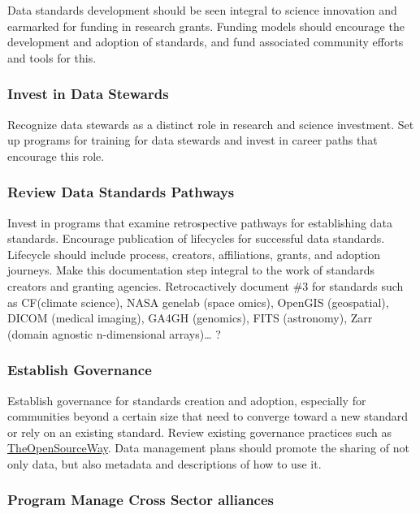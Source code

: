 \documentclass[
  letterpaper,
  DIV=11,
  numbers=noendperiod]{scrartcl}
\begin{document}
Data standards development should be seen integral to science innovation
and earmarked for funding in research grants. Funding models should
encourage the development and adoption of standards, and fund associated
community efforts and tools for this.

\subsubsection{Invest in Data Stewards}\label{invest-in-data-stewards}

Recognize data stewards as a distinct role in research and science
investment. Set up programs for training for data stewards and invest in
career paths that encourage this role.

\subsubsection{Review Data Standards
Pathways}\label{review-data-standards-pathways}

Invest in programs that examine retrospective pathways for establishing
data standards. Encourage publication of lifecycles for successful data
standards. Lifecycle should include process, creators, affiliations,
grants, and adoption journeys. Make this documentation step integral to
the work of standards creators and granting agencies. Retrocactively
document \#3 for standards such as CF(climate science), NASA genelab
(space omics), OpenGIS (geospatial), DICOM (medical imaging), GA4GH
(genomics), FITS (astronomy), Zarr (domain agnostic n-dimensional
arrays)\ldots{} ?

\subsubsection{Establish Governance}\label{establish-governance}

Establish governance for standards creation and adoption, especially for
communities beyond a certain size that need to converge toward a new
standard or rely on an existing standard. Review existing governance
practices such as
\href{https://www.theopensourceway.org/the_open_source_way-guidebook-2.0.html\#_project_and_community_governance}{TheOpenSourceWay}.
Data management plans should promote the sharing of not only data, but
also metadata and descriptions of how to use it.

\subsubsection{Program Manage Cross Sector
alliances}\label{program-manage-cross-sector-alliances}
\end{document}
